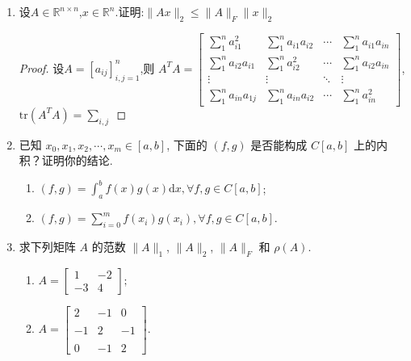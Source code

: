 \documentclass[a4paper]{article}
\begin{document}
\courseheader
{}

\begin{enumerate}
  \setlength{\itemsep}{3\parskip}

  \item 设$A\in\mathbb{R}^{n\times n}$,$x\in\mathbb{R}^{n}$.证明:$\|Ax\|_{2}\leq\|A\|_{F}\|x\|_{2}$
  \begin{proof}
    设$A=[a_{ij}]_{i,j=1}^{n}$,则
    $A^TA=\begin{bmatrix}
      \sum_{1}^{n}a_{i1}^2&\sum_{1}^{n}a_{i1}a_{i2}&\cdots&\sum_{1}^{n}a_{i1}a_{in}\\
      \sum_{1}^{n}a_{i2}a_{i1}&\sum_{1}^{n}a_{i2}^2&\cdots&\sum_{1}^{n}a_{i2}a_{in}\\
      \vdots&\vdots&\ddots&\vdots\\
      \sum_{1}^{n}a_{in}a_{1j}&\sum_{1}^{n}a_{in}a_{i2}&\cdots&\sum_{1}^{n}a_{in}^2
      \end{bmatrix}$,
    $\mathrm{tr}(A^TA)=\sum_{i,j}$
  \end{proof}

  \item 已知 $x_0, x_1, x_2, \cdots, x_m \in [a, b]$, 下面的 $(f, g)$ 是否能构成 $C[a, b]$ 上的内积？证明你的结论.
  \begin{enumerate}[label=（\arabic*）]
    \item $(f,g)=\int_{a}^{b}f(x)g(x)\mathrm{d}x,\forall f,g\in C[a,b]$;
    \item $(f,g)=\sum_{i=0}^{m}f(x_{i})g(x_{i}),\forall f,g\in C[a,b].$
    \begin{solution}
      
    \end{solution}
    
  \end{enumerate}

  \item 求下列矩阵 $A$ 的范数 $\|A\|_1$, $\|A\|_2$, $\|A\|_F$ 和 $\rho(A)$.
  \begin{enumerate}[label=（\arabic*）]
    \item $A=\left[\begin{array}{cc}1&-2\\-3&4\end{array}\right];$
    \begin{solution}
      
    \end{solution}
    \item $A=\begin{bmatrix}2&-1&0\\\\-1&2&-1\\\\0&-1&2\end{bmatrix}.$
    \begin{solution}
      

\end{solution}
\end{enumerate}
\end{enumerate}
\end{document}
